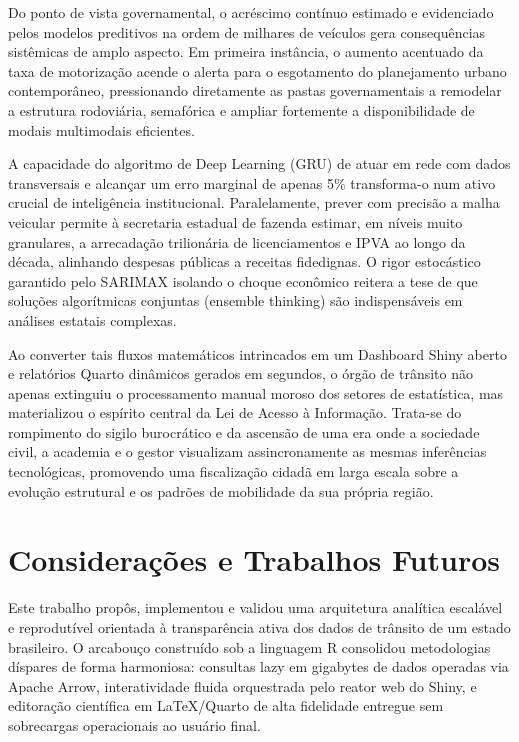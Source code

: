 \documentclass[10pt,conference]{IEEEtran}
\begin{document}
Do ponto de vista governamental, o acréscimo contínuo estimado e evidenciado pelos modelos preditivos na ordem de milhares de veículos gera consequências sistêmicas de amplo aspecto. Em primeira instância, o aumento acentuado da taxa de motorização acende o alerta para o esgotamento do planejamento urbano contemporâneo, pressionando diretamente as pastas governamentais a remodelar a estrutura rodoviária, semafórica e ampliar fortemente a disponibilidade de modais multimodais eficientes.

A capacidade do algoritmo de Deep Learning (GRU) de atuar em rede com dados transversais e alcançar um erro marginal de apenas 5\% transforma-o num ativo crucial de inteligência institucional. Paralelamente, prever com precisão a malha veicular permite à secretaria estadual de fazenda estimar, em níveis muito granulares, a arrecadação trilionária de licenciamentos e IPVA ao longo da década, alinhando despesas públicas a receitas fidedignas. O rigor estocástico garantido pelo SARIMAX isolando o choque econômico reitera a tese de que soluções algorítmicas conjuntas (ensemble thinking) são indispensáveis em análises estatais complexas.

Ao converter tais fluxos matemáticos intrincados em um Dashboard Shiny aberto e relatórios Quarto dinâmicos gerados em segundos, o órgão de trânsito não apenas extinguiu o processamento manual moroso dos setores de estatística, mas materializou o espírito central da Lei de Acesso à Informação. Trata-se do rompimento do sigilo burocrático e da ascensão de uma era onde a sociedade civil, a academia e o gestor visualizam assincronamente as mesmas inferências tecnológicas, promovendo uma fiscalização cidadã em larga escala sobre a evolução estrutural e os padrões de mobilidade da sua própria região.


\section{Considerações e Trabalhos Futuros}
\label{sec:conclui}

Este trabalho propôs, implementou e validou uma arquitetura analítica escalável e reprodutível orientada à transparência ativa dos dados de trânsito de um estado brasileiro. O arcabouço construído sob a linguagem R consolidou metodologias díspares de forma harmoniosa: consultas lazy em gigabytes de dados operadas via Apache Arrow, interatividade fluida orquestrada pelo reator web do Shiny, e editoração científica em LaTeX/Quarto de alta fidelidade entregue sem sobrecargas operacionais ao usuário final. 
\end{document}
